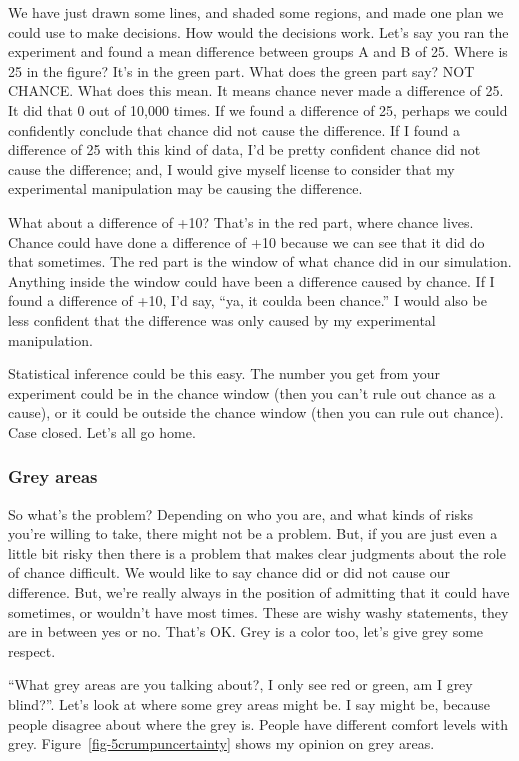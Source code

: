 \documentclass[
  letterpaper,
  DIV=11,
  numbers=noendperiod]{scrreprt}
\begin{document}
We have just drawn some lines, and shaded some regions, and made one
plan we could use to make decisions. How would the decisions work. Let's
say you ran the experiment and found a mean difference between groups A
and B of 25. Where is 25 in the figure? It's in the green part. What
does the green part say? NOT CHANCE. What does this mean. It means
chance never made a difference of 25. It did that 0 out of 10,000 times.
If we found a difference of 25, perhaps we could confidently conclude
that chance did not cause the difference. If I found a difference of 25
with this kind of data, I'd be pretty confident chance did not cause the
difference; and, I would give myself license to consider that my
experimental manipulation may be causing the difference.

What about a difference of +10? That's in the red part, where chance
lives. Chance could have done a difference of +10 because we can see
that it did do that sometimes. The red part is the window of what chance
did in our simulation. Anything inside the window could have been a
difference caused by chance. If I found a difference of +10, I'd say,
``ya, it coulda been chance.'' I would also be less confident that the
difference was only caused by my experimental manipulation.

Statistical inference could be this easy. The number you get from your
experiment could be in the chance window (then you can't rule out chance
as a cause), or it could be outside the chance window (then you can rule
out chance). Case closed. Let's all go home.

\subsubsection{Grey areas}\label{grey-areas}

So what's the problem? Depending on who you are, and what kinds of risks
you're willing to take, there might not be a problem. But, if you are
just even a little bit risky then there is a problem that makes clear
judgments about the role of chance difficult. We would like to say
chance did or did not cause our difference. But, we're really always in
the position of admitting that it could have sometimes, or wouldn't have
most times. These are wishy washy statements, they are in between yes or
no. That's OK. Grey is a color too, let's give grey some respect.

``What grey areas are you talking about?, I only see red or green, am I
grey blind?''. Let's look at where some grey areas might be. I say might
be, because people disagree about where the grey is. People have
different comfort levels with grey. Figure~\ref{fig-5crumpuncertainty}
shows my opinion on grey areas.
\end{document}
